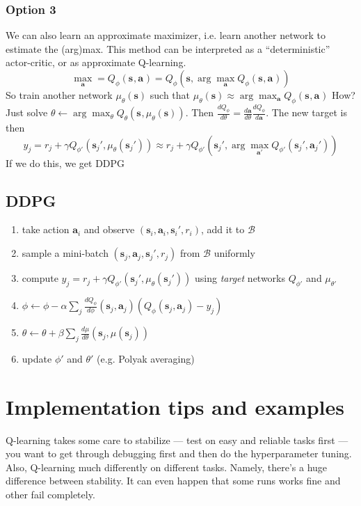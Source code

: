 \documentclass{report}
\newcommand{\argmax}{\arg\!\max}
\begin{document}
\subsubsection{Option 3}
We can also learn an approximate maximizer, i.e. learn another network to estimate the (arg)max.
This method can be interpreted as a ``deterministic'' actor-critic,
or as approximate Q-learning.
\begin{equation}
		\max_{\bm{a}}= Q_\phi(\bm{s}_{}, \bm{a}_{})= Q_\phi(\bm{s}, \argmax_{\bm{a}} Q_\phi(\bm{s}_{}, \bm{a}_{}))
\end{equation}
So train another network $\mu_\theta(\bm{s})$ such that $\mu_\theta(\bm{s}) \approx \argmax_{\bm{a}} Q_\phi(\bm{s}_{}, \bm{a}_{})$
How? Just solve $\theta \leftarrow \argmax_{\theta} Q_\theta(\bm{s}_{}, \mu_\theta (\bm{s}))$.
Then $ \frac{d Q_\phi}{d\theta} = \frac{d\bm{a}}{d\theta} \frac{dQ_\phi}{d\bm{a}}    $.
The new target is then
\begin{equation}
		y_j = r_j + \gamma Q_{\phi'}(\bm{s}_j', \mu_\theta (\bm{s}_j')) \approx
		r_j + \gamma Q_{\phi'} (\bm{s}_{j}', \argmax_{\bm{a}'}Q_{\phi'} (\bm{s}_{j}', \bm{a}_{j}'))
\end{equation}
If we do this, we get DDPG
\subsection{DDPG}
\begin{enumerate}
		\item take action $\bm{a}_i$ and observe $\left( \bm{s}_i, \bm{a}_i, \bm{s}_i', r_i \right)  $, add it to $\mathcal{B}$
		\item sample a mini-batch  $\left( \bm{s}_j, \bm{a}_j, \bm{s}_j', r_j \right)$  from $\mathcal{B}$ uniformly
		\item compute $y_j = r_j + \gamma Q_{\phi'}(\bm{s}_j', \mu_\theta (\bm{s}_j'))$ using \textit{target} networks $Q_{\phi'}$ and $\mu_{\theta'}$
		\item $\phi \leftarrow \phi  - \alpha \sum_{j}^{}  \frac{d Q_\phi}{d\phi} (\bm{s}_{j}, \bm{a}_{j}) \left( Q_\phi(\bm{s}_{j}, \bm{a}_{j}) - 
				y_j 	\right)$
		\item $\theta \leftarrow \theta + \beta \sum_{j}^{} \frac{d\mu}{d\theta} (\bm{s}_j, \mu(\bm{s}_j))$
		\item update $\phi'$ and $\theta'$ (e.g. Polyak averaging)
\end{enumerate}

\section{Implementation tips and examples}
Q-learning takes some care to stabilize --- test on easy and reliable tasks first --- you want to get through debugging first and then do the hyperparameter tuning.
Also, Q-learning much differently on different tasks. Namely, there's a huge difference between stability. It can even happen that some runs works fine
and other fail completely.
\end{document}
